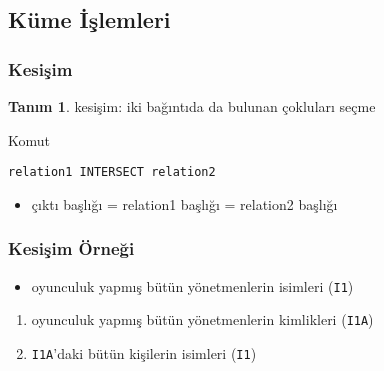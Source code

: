 \documentclass[dvipsnames]{beamer}
\theoremstyle{definition}
\newtheorem{tanim}[theorem]{Tanım}
\theoremstyle{example}
\theoremstyle{plain}
\begin{document}
\subsection{Küme İşlemleri}

\begin{frame}[fragile]
  \frametitle{Kesişim}

  \begin{tanim}
    \alert{kesişim}: iki bağıntıda da bulunan çokluları seçme
  \end{tanim}

  \pause
  \begin{block}{Komut}
    \begin{lstlisting}
relation1 INTERSECT relation2
    \end{lstlisting}
  \end{block}

  \pause
  \begin{itemize}
    \item çıktı başlığı = relation1 başlığı = relation2 başlığı
  \end{itemize}
\end{frame}

\begin{frame}
  \frametitle{Kesişim Örneği}

  \begin{example}
    \begin{itemize}
      \item oyunculuk yapmış bütün yönetmenlerin isimleri (\texttt{I1})
    \end{itemize}

    \pause
    \begin{enumerate}
      \item oyunculuk yapmış bütün yönetmenlerin kimlikleri (\texttt{I1A})

      \pause
      \item \texttt{I1A}'daki bütün kişilerin isimleri (\texttt{I1})
    \end{enumerate}
  \end{example}
\end{frame}
\end{document}
